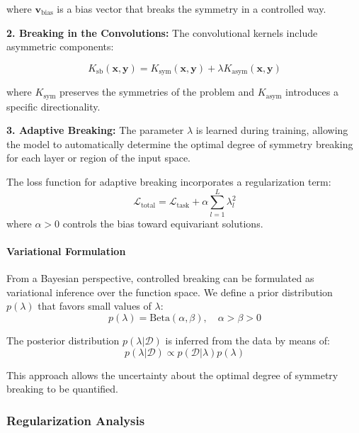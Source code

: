 where $\mathbf{v}_{\text{bias}}$ is a bias vector that breaks the symmetry in a controlled way.

\textbf{2. Breaking in the Convolutions:} The convolutional kernels include asymmetric components:

\begin{equation}
K_{\text{sb}}(\mathbf{x}, \mathbf{y}) = K_{\text{sym}}(\mathbf{x}, \mathbf{y}) + \lambda K_{\text{asym}}(\mathbf{x}, \mathbf{y})
\end{equation}

where $K_{\text{sym}}$ preserves the symmetries of the problem and $K_{\text{asym}}$ introduces a specific directionality.

\textbf{3. Adaptive Breaking:} The parameter $\lambda$ is learned during training, allowing the model to automatically determine the optimal degree of symmetry breaking for each layer or region of the input space.

The loss function for adaptive breaking incorporates a regularization term:
\begin{equation}
\mathcal{L}_{\text{total}} = \mathcal{L}_{\text{task}} + \alpha \sum_{l=1}^L \lambda_l^2
\end{equation}
where $\alpha > 0$ controls the bias toward equivariant solutions.

\paragraph{Variational Formulation}

From a Bayesian perspective, controlled breaking can be formulated as variational inference over the function space. We define a prior distribution $p(\lambda)$ that favors small values of $\lambda$:
\begin{equation}
p(\lambda) = \text{Beta}(\alpha, \beta), \quad \alpha > \beta > 0
\end{equation}

The posterior distribution $p(\lambda | \mathcal{D})$ is inferred from the data by means of:
\begin{equation}
p(\lambda | \mathcal{D}) \propto p(\mathcal{D} | \lambda) p(\lambda)
\end{equation}

This approach allows the uncertainty about the optimal degree of symmetry breaking to be quantified.

\subsubsection{Regularization Analysis}

